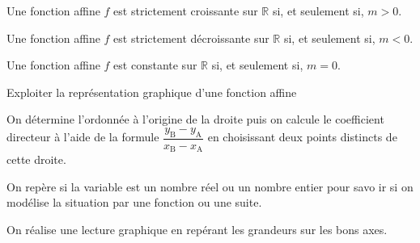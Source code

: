 \begin{proprietes}
	\begin{enumDef}
		\item Une fonction affine $f$ est strictement croissante sur $\mathbb{R}$ si, et seulement si, $m>0$.
		\item Une fonction affine $f$ est strictement décroissante sur $\mathbb{R}$ si, et seulement si, $m<0$.
		\item Une fonction affine $f$ est constante sur $\mathbb{R}$ si, et seulement si, $m=0$.
	\end{enumDef}
\end{proprietes}

\begin{methodeTitre}{Exploiter la représentation graphique d'une fonction affine}
	\begin{itemMet}
		\item On détermine l'ordonnée à l'origine de la droite puis on calcule le coefficient directeur à l'aide de la formule $\dfrac{y_{\mathrm{B}}-y_{\mathrm{A}}}{x_{\mathrm{B}}-x_{\mathrm{A}}}$ en choisissant deux points distincts de cette droite.
		\item On repère si la variable est un nombre réel ou un nombre entier pour savo ir si on modélise la situation par une fonction ou une suite.
		\item On réalise une lecture graphique en repérant les grandeurs sur les bons axes.
	\end{itemMet}
\end{methodeTitre}

